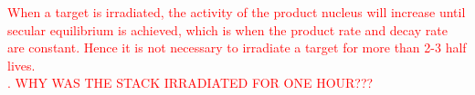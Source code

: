 






\textcolor{red}{
\noindent 
When a target is irradiated, the activity of the product nucleus will increase until secular equilibrium is achieved, which is when the product rate and decay rate are constant. Hence it is not necessary to irradiate a target for more than 2-3 half lives.\\. WHY WAS THE STACK IRRADIATED FOR ONE HOUR???}

